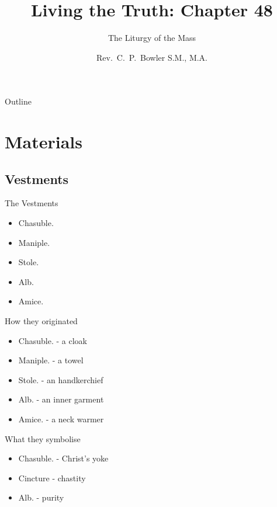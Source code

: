 \documentclass{beamer}
\title[Living the Truth 48] %
{Living the Truth: Chapter 48}
\subtitle
{The Liturgy of the Mass} %
\author{Rev.~C.~P.~Bowler S.M., M.A.}
\begin{document}
\begin{frame}
  \titlepage
\end{frame}

\begin{frame}{Outline}
  \tableofcontents
\end{frame}




\section{Materials}

\subsection{Vestments}

\begin{frame}{The Vestments}
\begin{itemize}
\item Chasuble.
\item Maniple. 
\item Stole.
\item Alb. 
\item Amice.
\end{itemize}
\end{frame}

\begin{frame}{How they originated}
\begin{itemize}
\item Chasuble. - a cloak
\item Maniple. - a towel
\item Stole. - an handkerchief
\item Alb. - an inner garment
\item Amice. - a neck warmer
\end{itemize}
\end{frame}


\begin{frame}{What they symbolise}
\begin{itemize}
\item Chasuble. - Christ's yoke
\item Cincture - chastity
\item Alb. - purity
\end{itemize}
\end{frame}
\end{document}

